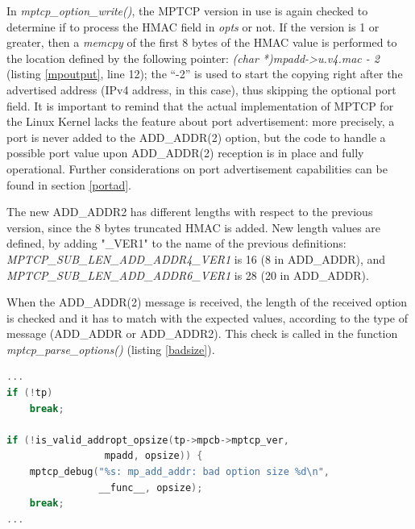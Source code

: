 In \textit{mptcp\_option\_write()}, the MPTCP version in use is again checked to determine if to process the HMAC field in \textit{opts} or not. If the version is 1 or greater, then a \textit{memcpy} of the first 8 bytes of the HMAC value is performed to the location defined by the following pointer: \textit{(char *)mpadd->u.v4.mac - 2} (listing \ref{mpoutput}, line 12); the ``-2'' is used to start the copying right after the advertised address (IPv4 address, in this case), thus skipping the optional port field. It is important to remind that the actual implementation of MPTCP for the Linux Kernel lacks the feature about port advertisement: more precisely, a port is never added to the ADD\_ADDR(2) option, but the code to handle a possible port value upon ADD\_ADDR(2) reception is in place and fully operational. Further considerations on port advertisement capabilities can be found in section \ref{portad}. 

The new ADD\_ADDR2 has different lengths with respect to the previous version, since the 8 bytes truncated HMAC is added. New length values are defined, by adding "\_VER1" to the name of the previous definitions: \textit{MPTCP\_SUB\_LEN\_ADD\_ADDR4\_VER1} is 16 (8 in ADD\_ADDR), and \textit{MPTCP\_SUB\_LEN\_ADD\_ADDR6\_VER1} is 28 (20 in ADD\_ADDR). 

When the ADD\_ADDR(2) message is received, the length of the received option is checked and it has to match with the expected values, according to the type of message (ADD\_ADDR or ADD\_ADDR2). This check is called in the function \textit{mptcp\_parse\_options()} (listing \ref{badsize}).

\begin{lstlisting}[language=c, caption=\textit{Check ADD\_ADDR size at the receiver, inside \textit{mptcp\_parse\_option()}}, label=badsize]
...
if (!tp)
	break;

if (!is_valid_addropt_opsize(tp->mpcb->mptcp_ver,
			     mpadd, opsize)) {
	mptcp_debug("%s: mp_add_addr: bad option size %d\n",
     		    __func__, opsize);
 	break;
...
\end{lstlisting}

